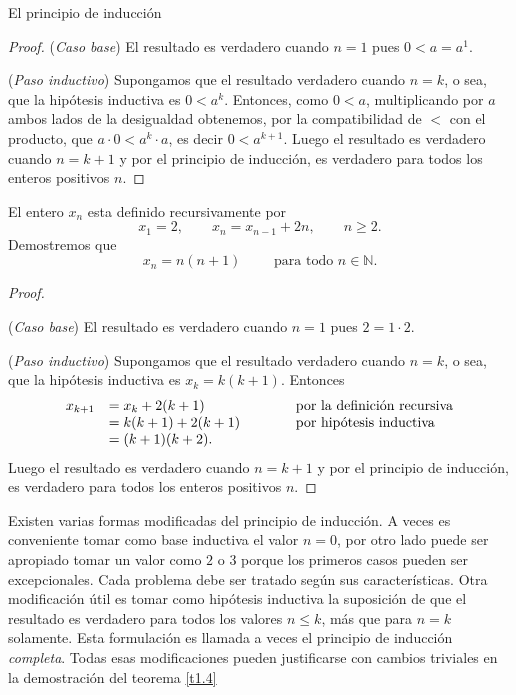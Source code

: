 \begin{section}{El principio de inducción}
\begin{proof}
\noindent (\textit{Caso  base}) El resultado es verdadero
cuando $n=1$ pues $ 0 < a=a^1$.

\noindent (\textit{Paso  inductivo})
 Supongamos que el resultado verdadero cuando $n=k$, o sea, que la hipótesis inductiva es $0 < a^k$. Entonces, como $0<a$, multiplicando por $a$ ambos lados de la desigualdad obtenemos, por la compatibilidad de $<$ con el producto, que $a\cdot 0 < a^k \cdot a$, es decir $0<a^{k+1}$.  Luego el resultado es verdadero cuando $n=k+1$ y por el principio de inducción, es verdadero para todos los enteros positivos $n$.
\end{proof}

\begin{ejemplo*} El entero $x_n$ esta definido recursivamente por
$$
x_1=2, \qquad x_n=x_{n-1} +2n, \qquad n\ge 2.
$$
Demostremos que
$$
x_n = n(n+1) \qquad \text{ para todo } n\in \mathbb N.
$$
\end{ejemplo*}
\begin{proof}
\    

\noindent(\textit{Caso  base}) El resultado es verdadero cuando $n=1$ pues $ 2 = 1 \cdot 2$.

\noindent (\textit{Paso  inductivo})
 Supongamos que el resultado verdadero cuando $n=k$, o sea, que la hipótesis inductiva es $x_k = k(k+1)$. Entonces
$$
\begin{matrix} 
x_{k+1} &= x_k + 2(k+1) \hfill &\qquad &\text{por la definición recursiva} \hfill \\
&= k(k+1)+2(k+1) \hfill &\qquad &\text{por hipótesis inductiva}\hfill \\
&= (k+1)(k+2). \hfill &
\end{matrix}
$$
Luego el resultado es verdadero cuando $n=k+1$ y por el principio de inducción, es verdadero para todos los enteros positivos $n$.
\end{proof}


Existen varias formas modificadas del principio de inducción. A veces es conveniente tomar como base inductiva el valor $n=0$, por otro lado puede ser apropiado tomar un valor como $2$ o $3$ porque los primeros casos pueden ser excepcionales. Cada problema debe ser tratado según sus características. Otra modificación útil es tomar como hipótesis inductiva la suposición de que el resultado es verdadero para todos los valores $n\le k$, más que para $n=k$ solamente. Esta formulación es llamada a veces el principio de inducción \textit{completa}. Todas esas modificaciones pueden justificarse con cambios triviales en la demostración del teorema \ref{t1.4}


\end{section}
